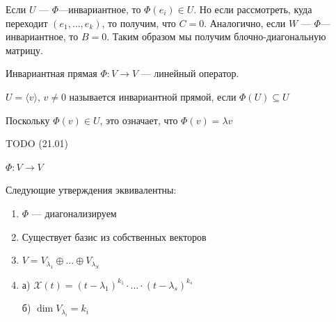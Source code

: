 Если \( U \) --- \( \Phi \)---инвариантное, то \( \Phi(e_i) \in U \).
Но если рассмотреть, куда переходит \( (e_1, \ldots, e_k) \),
то получим, что \( C = 0 \).
Аналогично, если \( W \) --- \( \Phi \)---инвариантное, то \( B = 0 \).
Таким образом мы получим блочно-диагональную матрицу.

\begin{defn}{Инвариантная прямая}{}
    \( \Phi : V \to V \) --- линейный оператор.

    \( U = \langle v \rangle \), \( v \neq 0 \) называется инвариантной прямой, если \( \Phi(U) \subseteq U \)

    Поскольку \( \Phi(v) \in U \), это означает, что \( \Phi(v) = \lambda v \)
\end{defn}

TODO (21.01)

\begin{lemma}{}{}
    \( \Phi : V \to V \)

    Следующие утверждения эквивалентны:
    \begin{enumerate}
        \item
            \( \Phi \) --- диагонализируем
        \item
            Существует базис из собственных векторов
        \item
            \( V = V_{\lambda_1} \oplus \ldots \oplus V_{\lambda_S} \)
        \item
            а) \( \mathcal{X} (t) = (t - \lambda_1)^{k_1} \cdot \ldots \cdot (t - \lambda_s)^{k_s} \)

            б) \( \dim V_{\lambda_i} = k_i \)
    \end{enumerate}
\end{lemma}

